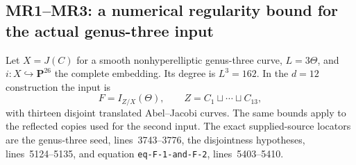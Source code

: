 \documentclass[11pt,a4paper]{article}
\theoremstyle{definition}\newtheorem{definition}[theorem]{Definition}
\theoremstyle{remark}\newtheorem{remark}[theorem]{Remark}
\begin{document}
\subsection*{MR1--MR3: a numerical regularity bound for the actual genus-three input}
Let $X=J(C)$ for a smooth nonhyperelliptic genus-three curve, $L=3\Theta$, and $i:X\hookrightarrow\mathbf P^{26}$ the complete embedding. Its degree is $L^3=162$. In the $d=12$ construction the input is
\[
 F=I_{Z/X}(\Theta),\qquad Z=C_1\sqcup\cdots\sqcup C_{13},
\]
with thirteen disjoint translated Abel--Jacobi curves. The same bounds apply to the reflected copies used for the second input. The exact supplied-source locators are the genus-three seed, lines~3743--3776, the disjointness hypotheses, lines~5124--5135, and equation \texttt{eq-F-1-and-F-2}, lines~5403--5410.
\end{document}
